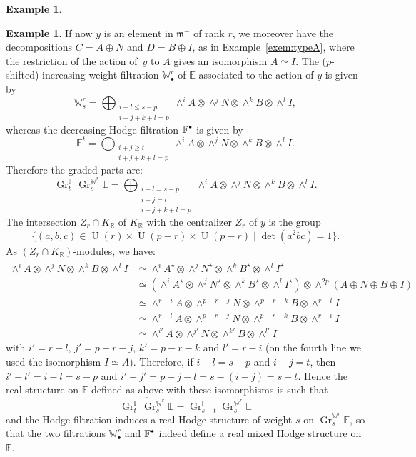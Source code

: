 \documentclass[10pt]{amsart}
\newcommand{\sbullet}{{\scriptscriptstyle\bullet}}
\newcommand{\scbullet}{{\raisebox{1pt}{$\sbullet$}}}
\theoremstyle{plain}
\theoremstyle{definition}
\newtheorem{exem}[theo]{Example}
\let\ov\overline
\let\rgy r
\DeclareMathOperator{\Gr}{Gr}
\DeclareMathOperator{\rU}{U}
\newcommand{\bE}{\mathbb{E}}
\newcommand{\bF}{\mathbb{F}}
\newcommand{\bR}{\mathbb{R}}
\newcommand{\Wr}{\mathbb{W}^\rgy}
\newcommand{\fm}{\mathfrak{m}}
\begin{document}
\begin{exem}
\begin{exem}
If now $y$ is an element in $\fm^-$ of rank $\rgy$, we moreover have the decompositions $C=A\oplus N$
and $D=B\oplus I$, as in Example~\ref{exem:typeA}, where the restriction of the action of~$y$ to $A$ gives an isomorphism
$A\simeq I$. The ($p$-shifted) increasing weight filtration $\Wr_\sbullet$ of $\bE$ associated
to the action of $y$ is given by
$$
\Wr_s=\bigoplus_{\substack{i-l\leq s-p\\ i+j+k+l=p}}\wedge^iA\otimes\wedge^jN\otimes\wedge^kB\otimes\wedge^lI,
$$
whereas the decreasing Hodge filtration $\bF^\scbullet$ is given by
$$
\bF^t=\bigoplus_{\substack{i+j\geq t\\ i+j+k+l=p}}\wedge^iA\otimes\wedge^jN\otimes\wedge^kB\otimes\wedge^lI.
$$
Therefore the graded parts are:
$$
\Gr^\bF_t\Gr^{\Wr}_s\bE=
\bigoplus_{\substack{i-l=s-p\\ i+j=t\\ i+j+k+l=p}}\wedge^iA\otimes\wedge^jN\otimes\wedge^kB\otimes\wedge^lI.
$$
The intersection $Z_r \cap K_\bR$ of $K_\bR$ with the centralizer $Z_r$ of $y$ is the group
$$\{(a,b,c)\in\rU(r)\times\rU(p-r)\times\rU(p-r)\mid \det(a^2bc)=1\}.$$
As $(Z_r \cap K_\bR)$-modules, we have:
\begin{align*}
\ov{\wedge^iA\otimes\wedge^jN\otimes\wedge^kB\otimes\wedge^lI}
& \simeq \wedge^iA^\star\otimes\wedge^jN^\star\otimes\wedge^kB^\star\otimes\wedge^lI^\star \\
& \simeq (\wedge^iA^\star\otimes\wedge^jN^\star\otimes\wedge^kB^\star\otimes\wedge^lI^\star)
\otimes\wedge^{2p}(A\oplus N\oplus B\oplus I) \\
& \simeq \wedge^{r-i}A\otimes\wedge^{p-r-j}N\otimes\wedge^{p-r-k}B\otimes\wedge^{r-l}I \\
& \simeq \wedge^{r-l}A\otimes\wedge^{p-r-j}N\otimes\wedge^{p-r-k}B\otimes\wedge^{r-i}I
\\
& \simeq \wedge^{i'}A\otimes\wedge^{j'}N\otimes\wedge^{k'}B\otimes\wedge^{l'}I
\end{align*}
with $i'=r-l$, $j'=p-r-j$, $k'=p-r-k$ and $l'=r-i$
(on the fourth line we used the isomorphism $I \simeq A$).
Therefore, if $i-l=s-p$ and $i+j=t$, then $i'-l'=i-l=s-p$ and $i'+j'=p-j-l=s-(i+j)=s-t$. Hence the real
structure on $\bE$ defined as above with these isomorphisms is such that
$$
\ov{\Gr^\bF_t\Gr^{\Wr}_s\bE}=\Gr^\bF_{s-t}\Gr^{\Wr}_s\bE
$$
and the Hodge filtration induces a real Hodge structure of weight $s$ on $\Gr^{\Wr}_s\bE$, so
that the two filtrations $\Wr_\sbullet$ and $\bF^\scbullet$ indeed define a real mixed Hodge
structure on $\bE$.
\end{exem}


\end{exem}
\end{document}
